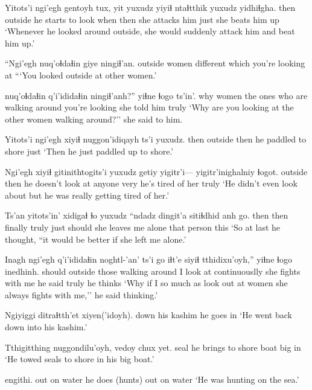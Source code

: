 \documentclass[12pt]{article}
\begin{document}
\gll Yitots'i ngi'egh gentoyh tux, yit yuxudz {yiyiɬ ntaɬtthik} yuxudz yidhiɬgha. 
then       outside {he starts to look} when then {}    {she attacks him} just {she beats him up}
\glt `Whenever he looked around outside, she would suddenly attack him and beat him up.' 
\glend

\gll ``Ngi'egh nuq'oɬdaɬin giye      ningiɬ'an. 
outside   women      different {which you're looking at}
\glt ```You looked outside at other women.' 
\glend

 nuq'oɬdaɬin q'i'ididaɬin ningiɬ'anh?'' yiɬne ɬogo ts'in'. 
why          women      {the ones who are walking around} {you're looking} {she told him} truly {}
\glt `Why are you looking at the other women walking around?'' she said to him. 
\glend

\gll Yitots'i ngi'egh xiyiɬ nuggon'idiqayh ts'i yuxudz. 
then       outside  then {he paddled to shore} {} just
\glt `Then he just paddled up to shore.' 
\glend

\gll Ngi'egh xiyiɬ {gitinithtogits'i} yuxudz getiy {yigitr'i---} yigitr'inighalniy {ɬogot}. 
outside then  {he doesn't look at anyone} {} very {} {he's tired of her} truly
\glt `He didn't even look about but he was really getting tired of her.' 
\glend

\gll Ts'an yitots'in' xidigaɬ ɬo yuxudz {``ndadz dingit'a} {sitiɬdhid} anh go. 
then   then finally     truly just should {she leaves me alone} {that person} this
\glt `So at last he thought, ``it would be better if she left me alone.'
\glend

\gll Inagh ngi'egh q'i'ididaɬin noghtl-'an' {ts'i go} iɬt'e {siyiɬ tthidixu'oyh},'' yiɬne {ɬogo} inedhinh. 
should outside {those walking around} {I look at} {} continuouslly {she fights with me} {he said} truly {he thinks}
\glt `Why if I so much as look out at women she always fights with me,'' he said thinking.' 
\glend

\gll Ngiyiggi ditraɬtth'et xiyen('idoyh). 
{down} {his kashim} {he goes in}
\glt `He went back down into his kashim.' 
\glend

\gll Tthigitthing nuggondilu'oyh, vedoy chux yet.
seal     {he brings to shore}  boat big in 
\glt `He towed seals to shore in his big boat.' 
\glend

 engithi. 
{out on water} {he does (hunts)} {out on water}
\glt `He was hunting on the sea.' 
\glend
\end{document}
